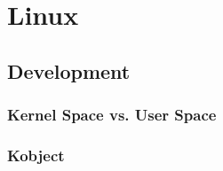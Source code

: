 \chapter{Linux}

\section{Development}

\subsection{Kernel Space vs. User Space}

\subsection{Kobject}
